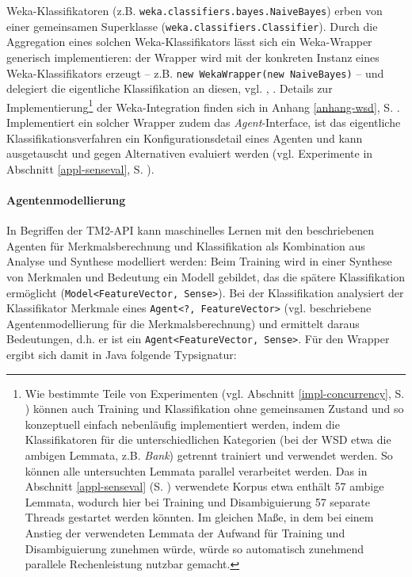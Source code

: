 \documentclass[abstracton, 12pt]{scrartcl}
\begin{document}
Weka-Klassifikatoren (z.B. \lstinline!weka.classifiers.bayes.NaiveBayes!) erben von einer gemeinsamen Superklasse (\lstinline!weka.classifiers.Classifier!). Durch die Aggregation eines solchen Weka-Klass\-ifi\-ka\-tors lässt sich ein Weka-Wrapper generisch implementieren: der Wrapper wird mit der konkreten Instanz eines  Weka-Klassifikators erzeugt -- z.B.  \lstinline!new WekaWrapper(new NaiveBayes)! -- und delegiert die eigentliche Klassifikation an diesen, vgl. \citet[81]{Bloch2008}, \citet[20]{GammaEtAl1995}. Details zur Implementierung\footnote{Wie bestimmte Teile von Experimenten (vgl. Abschnitt \ref{impl-concurrency}, S. \pageref{impl-concurrency}) können auch Training und Klassifikation ohne gemeinsamen Zustand und so konzeptuell einfach nebenläufig implementiert werden, indem die Klassifikatoren für die unterschiedlichen Kategorien (bei der WSD etwa die ambigen Lemmata, z.B. \emph{Bank}) getrennt trainiert und verwendet werden. So können alle untersuchten Lemmata parallel verarbeitet werden. Das in Abschnitt \ref{appl-senseval} (S. \pageref{appl-senseval}) verwendete Korpus etwa enthält 57 ambige Lemmata, wodurch hier bei Training und Disambiguierung 57 separate Threads gestartet werden könnten. Im gleichen Maße, in dem bei einem Anstieg der verwendeten Lemmata der Aufwand für Training und Disambiguierung zunehmen würde, würde so automatisch zunehmend parallele Rechenleistung nutzbar gemacht.} der Weka-Integration finden sich in Anhang \ref{anhang-wsd}, S. \pageref{anhang-wsd}. Implementiert ein solcher Wrapper zudem das \emph{Agent}-Interface, ist das eigentliche Klassifikationsverfahren ein Konfigurationsdetail eines Agenten und kann ausgetauscht und gegen Alternativen evaluiert werden (vgl. Experimente in Abschnitt \ref{appl-senseval}, S. \pageref{appl-senseval}).

\paragraph{Agentenmodellierung}

In Begriffen der TM2-API kann maschinelles Lernen mit den beschriebenen Agenten für Merkmalsberechnung und Klassifikation als Kombination aus Analyse und Synthese modelliert werden: Beim Training wird in einer Synthese von Merkmalen und Bedeutung ein Modell gebildet, das die spätere Klassifikation ermöglicht (\lstinline!Model<FeatureVector, Sense>!). Bei der Klassifikation analysiert der Klassifikator Merkmale eines \lstinline!Agent<?, FeatureVector>! (vgl. beschriebene Agentenmodellierung für die Merkmalsberechnung) und ermittelt daraus Bedeutungen, d.h. er ist ein \lstinline!Agent<FeatureVector, Sense>!. Für den Wrapper ergibt sich damit in Java folgende Typsignatur:
\end{document}
